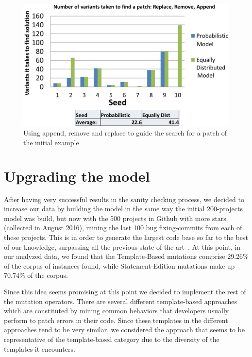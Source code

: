 \documentclass[conference]{IEEEtran}
\begin{document}
\begin{figure}[!h]
  \centering
    \includegraphics[scale=0.25]{sanity4}
  \caption{Using append, remove and replace to guide the search for a patch of 
the initial example}
  \label{fig:resultsARR}
\end{figure}

\section{Upgrading the model}
After having very successful results in the sanity checking process, we decided 
to increase our data by building the model in the same way the initial 200-projects model was build, but now with the 500 projects in Github with more 
stars (collected in August 2016), mining the last 100 bug fixing-commits from each of these projects. This is in order to generate the largest code base so far to the best 
of our knowledge, surpassing all the previous state of the 
art~\cite{long15,Soto15,zhong15,matias15,xuan16}. At this point, in our analyzed data, 
we found that the Template-Based mutations comprise 29.26\% of the corpus of 
instances found, while Statement-Edition mutations make up 70.74\% of the 
corpus.

Since this idea seems promising at this point we decided to implement the rest 
of the mutation operators. There are several different template-based approaches 
\cite{kim2013,fan15,long15} which are constituted by mining common behaviors 
that developers usually perform to patch errors in their code. Since these 
templates in the different approaches tend to be very similar, we considered the 
approach that seems to be representative of the template-based category due to 
the diversity of the templates it encounters. 
\end{document}
